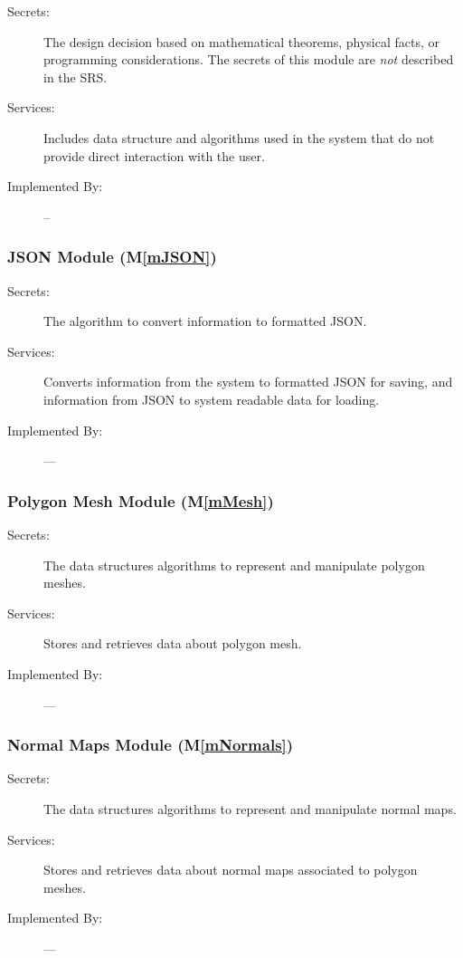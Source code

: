 \documentclass[12pt, titlepage]{article}
\newcommand{\mref}[1]{M\ref{#1}}
\begin{document}
\begin{description}
	\item[Secrets:] The design decision based on mathematical theorems, physical
	facts, or programming considerations. The secrets of this module are
	\emph{not} described in the SRS.
	\item[Services:] Includes data structure and algorithms used in the system 
	that
	do not provide direct interaction with the user. 
	\item[Implemented By:] --
\end{description}

\subsubsection{JSON Module (\mref{mJSON})}

\begin{description}
	\item[Secrets:]The algorithm to convert information to formatted JSON.
	\item[Services:]Converts information from the system to formatted JSON for 
	saving, and information from JSON to system readable data for loading.
	\item[Implemented By:] ---
\end{description}

\subsubsection{Polygon Mesh Module (\mref{mMesh})}

\begin{description}
	\item[Secrets:]The data structures algorithms to represent and manipulate 
	polygon meshes.
	\item[Services:]Stores and retrieves data about polygon mesh.
	\item[Implemented By:] ---
\end{description}

\subsubsection{Normal Maps Module (\mref{mNormals})}
\begin{description}
	\item[Secrets:]The data structures algorithms to represent and manipulate 
	normal maps.
	\item[Services:]Stores and retrieves data about normal maps associated to 
	polygon meshes.
	\item[Implemented By:] ---
\end{description}
\end{document}
